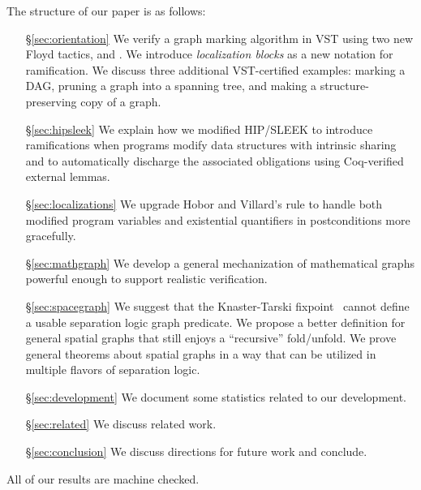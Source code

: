 The structure of our paper is as follows:
\begin{itemize}
\item[\S\ref{sec:orientation}] We verify a graph marking algorithm in VST using two new Floyd tactics,  and .  We introduce \emph{localization blocks} as a new notation for ramification.  We discuss three additional VST-certified examples: marking a DAG, pruning a graph into a spanning tree, and making a structure-preserving copy of a graph.
\item[\S\ref{sec:hipsleek}] We explain how we modified HIP/SLEEK to introduce ramifications when programs modify data structures with intrinsic sharing and to automatically discharge the associated obligations using Coq-verified external lemmas.
\item[\S\ref{sec:localizations}] We upgrade Hobor and Villard's  rule to handle both modified program variables and existential quantifiers in postconditions more gracefully.
\item[\S\ref{sec:mathgraph}] We develop a general mechanization of mathematical graphs powerful enough to support realistic verification. %
\item[\S\ref{sec:spacegraph}] We suggest that the Knaster-Tarski fixpoint~\cite{tarski:fixpoint} cannot define a usable separation logic graph predicate.  We propose a better definition for general spatial graphs that still enjoys a ``recursive'' fold/unfold.  We prove general theorems about spatial graphs in a way that can be utilized in multiple flavors of separation logic. %
\item[\S\ref{sec:development}] We document some statistics related to our development.
\item[\S\ref{sec:related}] We discuss related work.
\item[\S\ref{sec:conclusion}] We discuss directions for future work and conclude.
\end{itemize}
All of our results are machine checked.

